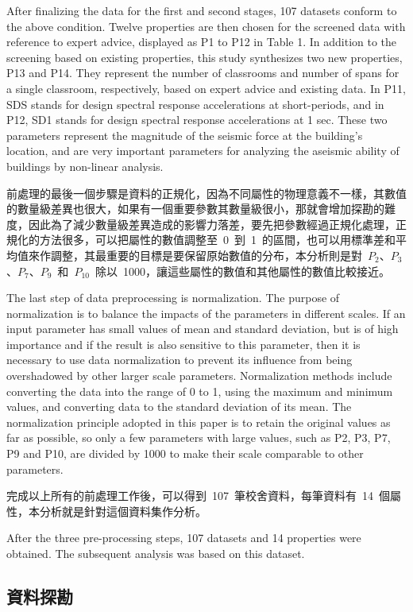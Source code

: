 After finalizing the data for the first and second stages, 107 datasets conform to the above condition. Twelve properties are then chosen for the screened data with reference to expert advice, displayed as P1 to P12 in Table 1. In addition to the screening based on existing properties, this study synthesizes two new properties, P13 and P14. They represent the number of classrooms and number of spans for a single classroom, respectively, based on expert advice and existing data. In P11, SDS stands for design spectral response accelerations at short-periods, and in P12, SD1 stands for design spectral response accelerations at 1 sec. These two parameters represent the magnitude of the seismic force at the building’s location, and are very important parameters for analyzing the aseismic ability of buildings by non-linear analysis.

前處理的最後一個步驟是資料的正規化，因為不同屬性的物理意義不一樣，其數值的數量級差異也很大，如果有一個重要參數其數量級很小，那就會增加探勘的難度，因此為了減少數量級差異造成的影響力落差，要先把參數經過正規化處理，正規化的方法很多，可以把屬性的數值調整至~0~到~1~的區間，也可以用標準差和平均值來作調整，其最重要的目標是要保留原始數值的分布，本分析則是對~$P_2$、$P_3$、$P_7$、$P_9$~和~$P_{10}$~除以~1000，讓這些屬性的數值和其他屬性的數值比較接近。

The last step of data preprocessing is normalization. The purpose of normalization is to balance the impacts of the parameters in different scales. If an input parameter has small values of mean and standard deviation, but is of high importance and if the result is also sensitive to this parameter, then it is necessary to use data normalization to prevent its influence from being overshadowed by other larger scale parameters. Normalization methods include converting the data into the range of 0 to 1, using the maximum and minimum values, and converting data to the standard deviation of its mean. The normalization principle adopted in this paper is to retain the original values as far as possible, so only a few parameters with large values, such as P2, P3, P7, P9 and P10, are divided by 1000 to make their scale comparable to other parameters.

完成以上所有的前處理工作後，可以得到~107~筆校舍資料，每筆資料有~14~個屬性，本分析就是針對這個資料集作分析。

After the three pre-processing steps, 107 datasets and 14 properties were obtained. The subsequent analysis was based on this dataset.

\subsection{資料探勘}

